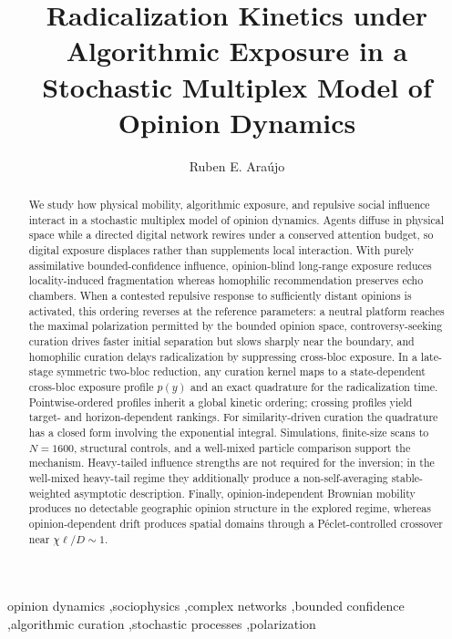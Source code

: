 \documentclass[5p,times,twocolumn]{elsarticle}
\begin{document}
\begin{frontmatter}
\title{Radicalization Kinetics under Algorithmic Exposure in a Stochastic Multiplex Model of Opinion Dynamics}
\author{Ruben E. Ara\'ujo}
\address{Independent Researcher}
\begin{abstract}
We study how physical mobility, algorithmic exposure, and repulsive social
influence interact in a stochastic multiplex model of opinion dynamics.
Agents diffuse in physical space while a directed digital network rewires
under a conserved attention budget, so digital exposure displaces rather
than supplements local interaction. With purely assimilative
bounded-confidence influence, opinion-blind long-range exposure reduces
locality-induced fragmentation whereas homophilic recommendation preserves
echo chambers. When a contested repulsive response to sufficiently distant
opinions is activated, this ordering reverses at the reference parameters:
a neutral platform reaches the maximal polarization permitted by the
bounded opinion space, controversy-seeking curation drives faster initial
separation but slows sharply near the boundary, and homophilic curation
delays radicalization by suppressing cross-bloc exposure. In a late-stage
symmetric two-bloc reduction, any curation kernel maps to a state-dependent
cross-bloc exposure profile $p(y)$ and an exact quadrature for the
radicalization time. Pointwise-ordered profiles inherit a global kinetic
ordering; crossing profiles yield target- and horizon-dependent rankings.
For similarity-driven curation the quadrature has a closed form involving
the exponential integral. Simulations, finite-size scans to $N=1600$,
structural controls, and a well-mixed particle comparison support the
mechanism. Heavy-tailed influence strengths are not required for the
inversion; in the well-mixed heavy-tail regime they additionally produce a
non-self-averaging stable-weighted asymptotic description. Finally,
opinion-independent Brownian mobility produces no detectable geographic
opinion structure in the explored regime, whereas opinion-dependent drift
produces spatial domains through a P\'eclet-controlled crossover near
$\chi\ell/D\sim1$.
\end{abstract}
\begin{keyword}
opinion dynamics \sep sociophysics \sep complex networks \sep bounded confidence \sep algorithmic curation \sep stochastic processes \sep polarization
\end{keyword}
\end{frontmatter}
\end{document}
